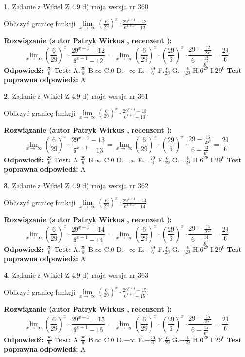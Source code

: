 \documentclass[12pt, a4paper]{article}
\theoremstyle{definition} %
\newtheorem{zad}{}
\newcommand{\zadStart}[1]{\begin{zad}#1\newline}
\newcommand{\zadStop}{\end{zad}}
\newcommand{\rozwStart}[2]{\noindent \textbf{Rozwiązanie (autor #1 , recenzent #2): }\newline}
\newcommand{\rozwStop}{\newline}
\newcommand{\odpStart}{\noindent \textbf{Odpowiedź:}\newline}
\newcommand{\odpStop}{\newline}
\newcommand{\testStart}{\noindent \textbf{Test:}\newline}
\newcommand{\testStop}{\newline}
\newcommand{\kluczStart}{\noindent \textbf{Test poprawna odpowiedź:}\newline}
\newcommand{\kluczStop}{\newline}
\begin{document}
\zadStart{Zadanie z Wikieł Z 4.9 d) moja wersja nr 360}


Obliczyć granicę funkcji  $\lim\limits_{x\to\ \infty}(\frac{6}{29})^{x}\cdot\frac{29^{x+1}-12}{6^{x+1}-12}$.
\zadStop
\rozwStart{Patryk Wirkus}{}
$$\lim\limits_{x\to\ \infty}(\frac{6}{29})^{x}\cdot\frac{29^{x+1}-12}{6^{x+1}-12}=\lim\limits_{x\to\ \infty}(\frac{6}{29})^{x}\cdot(\frac{29}{6})^{x} \cdot \frac{29-\frac{12}{29^{x}}}{6-\frac{12}{6^{x}}} = \frac{29}{6}$$
\rozwStop
\odpStart
$\frac{29}{6}$
\odpStop
\testStart
A.$\frac{29}{6}$ B.$\infty$ C.$0$ D.$-\infty$ E.$-\frac{29}{6}$
F.$\frac{6}{29}$ G.$-\frac{6}{29}$
H.$6^{29}$
I.$29^{6}$
\testStop
\kluczStart
A
\kluczStop



\zadStart{Zadanie z Wikieł Z 4.9 d) moja wersja nr 361}


Obliczyć granicę funkcji  $\lim\limits_{x\to\ \infty}(\frac{6}{29})^{x}\cdot\frac{29^{x+1}-13}{6^{x+1}-13}$.
\zadStop
\rozwStart{Patryk Wirkus}{}
$$\lim\limits_{x\to\ \infty}(\frac{6}{29})^{x}\cdot\frac{29^{x+1}-13}{6^{x+1}-13}=\lim\limits_{x\to\ \infty}(\frac{6}{29})^{x}\cdot(\frac{29}{6})^{x} \cdot \frac{29-\frac{13}{29^{x}}}{6-\frac{13}{6^{x}}} = \frac{29}{6}$$
\rozwStop
\odpStart
$\frac{29}{6}$
\odpStop
\testStart
A.$\frac{29}{6}$ B.$\infty$ C.$0$ D.$-\infty$ E.$-\frac{29}{6}$
F.$\frac{6}{29}$ G.$-\frac{6}{29}$
H.$6^{29}$
I.$29^{6}$
\testStop
\kluczStart
A
\kluczStop



\zadStart{Zadanie z Wikieł Z 4.9 d) moja wersja nr 362}


Obliczyć granicę funkcji  $\lim\limits_{x\to\ \infty}(\frac{6}{29})^{x}\cdot\frac{29^{x+1}-14}{6^{x+1}-14}$.
\zadStop
\rozwStart{Patryk Wirkus}{}
$$\lim\limits_{x\to\ \infty}(\frac{6}{29})^{x}\cdot\frac{29^{x+1}-14}{6^{x+1}-14}=\lim\limits_{x\to\ \infty}(\frac{6}{29})^{x}\cdot(\frac{29}{6})^{x} \cdot \frac{29-\frac{14}{29^{x}}}{6-\frac{14}{6^{x}}} = \frac{29}{6}$$
\rozwStop
\odpStart
$\frac{29}{6}$
\odpStop
\testStart
A.$\frac{29}{6}$ B.$\infty$ C.$0$ D.$-\infty$ E.$-\frac{29}{6}$
F.$\frac{6}{29}$ G.$-\frac{6}{29}$
H.$6^{29}$
I.$29^{6}$
\testStop
\kluczStart
A
\kluczStop



\zadStart{Zadanie z Wikieł Z 4.9 d) moja wersja nr 363}


Obliczyć granicę funkcji  $\lim\limits_{x\to\ \infty}(\frac{6}{29})^{x}\cdot\frac{29^{x+1}-15}{6^{x+1}-15}$.
\zadStop
\rozwStart{Patryk Wirkus}{}
$$\lim\limits_{x\to\ \infty}(\frac{6}{29})^{x}\cdot\frac{29^{x+1}-15}{6^{x+1}-15}=\lim\limits_{x\to\ \infty}(\frac{6}{29})^{x}\cdot(\frac{29}{6})^{x} \cdot \frac{29-\frac{15}{29^{x}}}{6-\frac{15}{6^{x}}} = \frac{29}{6}$$
\rozwStop
\odpStart
$\frac{29}{6}$
\odpStop
\testStart
A.$\frac{29}{6}$ B.$\infty$ C.$0$ D.$-\infty$ E.$-\frac{29}{6}$
F.$\frac{6}{29}$ G.$-\frac{6}{29}$
H.$6^{29}$
I.$29^{6}$
\testStop
\kluczStart
A
\kluczStop
\end{document}
